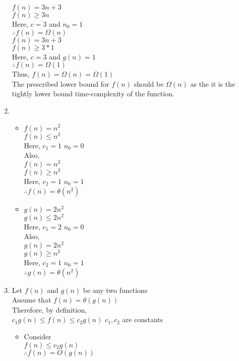 \documentclass[12pt, a4paper]{article}
\begin{document}
\begin{enumerate}[label=(\alph*)]
		$f(n) = 3n + 3$\\
		$f(n) \geq 3n$ \\
		Here, $c=3$ and $n_0=1$\\
		$\therefore f(n) = \Omega(n)$\\
		
		$f(n) = 3n + 3$\\
		$f(n) \geq 3 * 1$ \\
		Here, $c=3$ and $g(n)=1$\\
		$\therefore f(n) = \Omega(1)$\\		
		
		Thus, $f(n) = \Omega(n) = \Omega(1)$\\
		The prescribed lower bound for $f(n)$ should be $\Omega(n)$ as the it is the tightly lower bound time-complexity of the function.\\
		
		\item 
		\begin{itemize}
			\item $f(n) = n^2$\\
			$f(n) \leq n^2$\\
			Here, $c_1 = 1$ $n_0=0$\\
			
			Also, \\
			$f(n) = n^2$\\
			$f(n) \geq n^2$\\
			Here, $c_2 = 1$ $n_0=1$\\
			$\therefore f(n)=\theta(n^2)$
			\vspace{1 cm}
			
			\item $g(n) = 2n^2$\\
			$g(n) \leq 2n^2$\\
			Here, $c_1 = 2$ $n_0=0$\\
			
			Also, \\
			$g(n) = 2n^2$\\
			$g(n) \geq n^2$\\
			Here, $c_2 = 1$ $n_0=1$\\
			$\therefore g(n)=\theta(n^2)$
			
			
		\end{itemize}
		
		\item Let $f(n)$ and $g(n)$ be any two functions\\
		Assume that $f(n)=\theta(g(n))$\\
		Therefore, by definition,\\
		$c_1 g(n) \leq f(n) \leq c_2 g(n)$ \hspace{2cm}$c_1,c_2$ are constants\\
		\begin{itemize}
			\item Consider \\$f(n) \leq c_2 g(n)$\\
			$\therefore f(n) = O(g(n))$\\
			

\end{itemize}
\end{enumerate}
\end{document}
